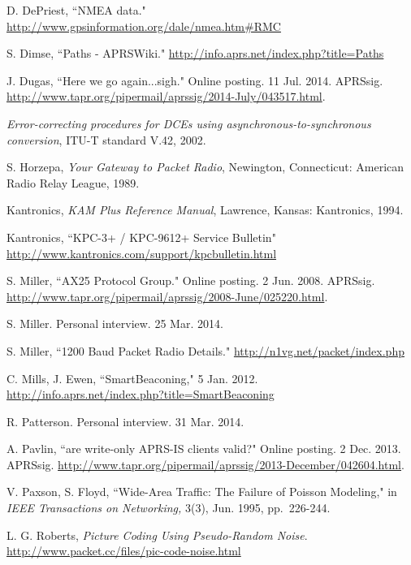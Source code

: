 \begin{thebibliography}{99}
		D. DePriest,
		``NMEA data."
		\url{http://www.gpsinformation.org/dale/nmea.htm#RMC}

		S. Dimse, ``Paths - APRSWiki."
		\url{http://info.aprs.net/index.php?title=Paths}

		J. Dugas,
		``Here we go again...sigh."
		Online posting. 11 Jul. 2014. APRSsig.
		\url{http://www.tapr.org/pipermail/aprssig/2014-July/043517.html}.

		\emph{Error-correcting procedures for DCEs using 
		asynchronous-to-synchronous conversion}, ITU-T standard V.42, 2002.

		S. Horzepa,
		\emph{Your Gateway to Packet Radio},
		Newington, Connecticut: American Radio Relay League, 1989.

		Kantronics,
		\emph{KAM Plus Reference Manual},
		Lawrence, Kansas: Kantronics, 1994.

		Kantronics, ``KPC-3+ / KPC-9612+ Service Bulletin"
		\url{http://www.kantronics.com/support/kpcbulletin.html}

		S. Miller,
		``AX25 Protocol Group."
		Online posting. 2 Jun. 2008. APRSsig.
		\url{http://www.tapr.org/pipermail/aprssig/2008-June/025220.html}.

		S. Miller. Personal interview. 25 Mar. 2014.

		S. Miller,
		``1200 Baud Packet Radio Details."
		\url{http://n1vg.net/packet/index.php}

		C. Mills, J. Ewen,
		``SmartBeaconing,"
		5 Jan. 2012.
		\url{http://info.aprs.net/index.php?title=SmartBeaconing}

		R. Patterson. Personal interview. 31 Mar. 2014.

		A. Pavlin,
		``are write-only APRS-IS clients valid?"
		Online posting. 2 Dec. 2013. APRSsig.
		\url{http://www.tapr.org/pipermail/aprssig/2013-December/042604.html}.

		V. Paxson, S. Floyd,
		``Wide-Area Traffic: The Failure of Poisson Modeling," in
		\emph{IEEE Transactions on Networking,}
		3(3), Jun. 1995, pp.~226-244.

		L. G. Roberts,
		\emph{Picture Coding Using Pseudo-Random Noise}.
		\url{http://www.packet.cc/files/pic-code-noise.html}


\end{thebibliography}
